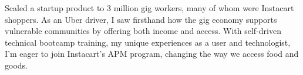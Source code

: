 
{

    Scaled a startup product to 3 million gig workers, many of whom were Instacart shoppers. As an Uber driver, I saw firsthand how the gig economy supports vulnerable communities by offering both income and access. With self-driven technical bootcamp training, my unique experiences as a user and technologist, I'm eager to join Instacart’s APM program, changing the way we access food and goods.

}